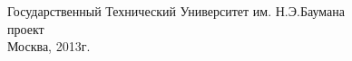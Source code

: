 \documentclass{article}
\begin{document}
\begin{titlepage}
\begin{center}
{ Государственный Технический Университет им. Н.Э.Баумана}
\\[37mm]
{ проект}
\\[37mm]
Москва, 2013г.
\end{center}
\end{titlepage}

\tableofcontents

\newpage






\end{document}
